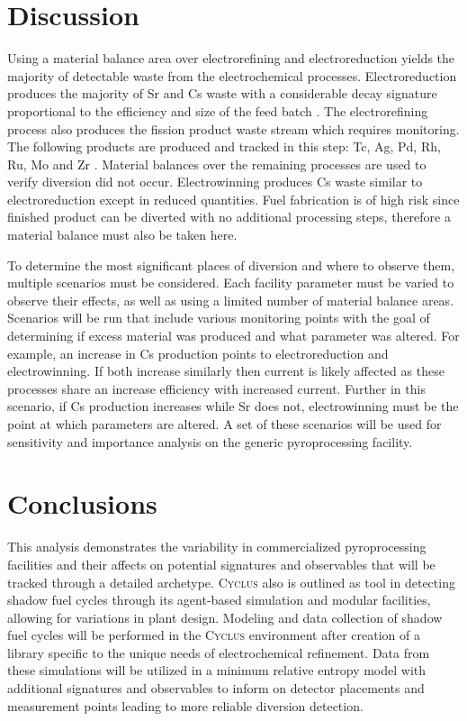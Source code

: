 \documentclass{anstrans}
\newcommand{\Cyclus}{\textsc{Cyclus}\xspace}%
\begin{document}
\section{Discussion}
Using a material balance area over electrorefining and electroreduction yields the majority of detectable waste from the electrochemical processes. Electroreduction produces the majority of Sr and Cs waste with a considerable decay signature proportional to the efficiency and size of the feed batch \cite{Borrelli_2017,flowsheet_1998}. The electrorefining process also produces the fission product waste stream which requires monitoring. The following products are produced and tracked in this step: Tc, Ag, Pd, Rh, Ru, Mo and Zr \cite{flowsheet_1998}. Material balances over the remaining processes are used to verify diversion did not occur. Electrowinning produces Cs waste similar to electroreduction except in reduced quantities. Fuel fabrication is of high risk since finished product can be diverted with no additional processing steps, therefore a material balance must also be taken here. 

To determine the most significant places of diversion and where to observe them, multiple scenarios must be considered. Each facility parameter must be varied to observe their effects, as well as using a limited number of material balance areas. Scenarios will be run that include various monitoring points with the goal of determining if excess material was produced and what parameter was altered. For example, an increase in Cs production points to electroreduction and electrowinning. If both increase similarly then current is likely affected as these processes share an increase efficiency with increased current. Further in this scenario, if Cs production increases while Sr does not, electrowinning must be the point at which parameters are altered. A set of these scenarios will be used for sensitivity and importance analysis on the generic pyroprocessing facility.

\section{Conclusions}
This analysis demonstrates the variability in commercialized pyroprocessing facilities and their affects on potential signatures and observables that will be tracked through a detailed archetype. \Cyclus also is outlined as tool in detecting shadow fuel cycles through its agent-based simulation and modular facilities, allowing for variations in plant design. Modeling and data collection of shadow fuel cycles will be performed in the \Cyclus environment after creation of a library specific to the unique needs of electrochemical refinement. Data from these simulations will be utilized in a minimum relative entropy model with additional signatures and observables to inform on detector placements and measurement points leading to more reliable diversion detection.
\end{document}
